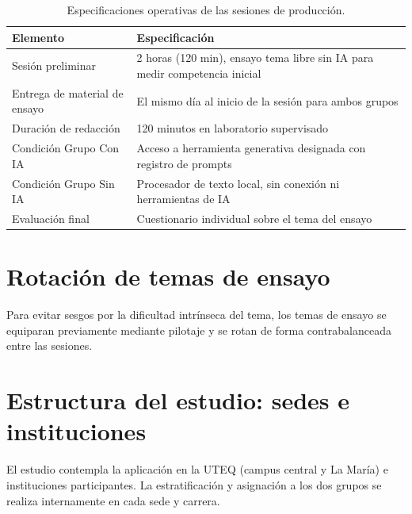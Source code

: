 \documentclass[12pt,a4paper,openany]{report}
\begin{document}
    \begin{table}[htbp]
        \centering
        \caption{Especificaciones operativas de las sesiones de producci\'on.}
        \label{tab:condiciones}
        \small
        \begin{tabular}{L{4.5cm} L{9.0cm}}
            \toprule
            \textbf{Elemento} & \textbf{Especificaci\'on} \\
            \midrule
            Sesi\'on preliminar & 2 horas (120 min), ensayo tema libre sin IA para medir competencia inicial \\
            Entrega de material de ensayo & El mismo d\'ia al inicio de la sesi\'on para ambos grupos \\
            Duraci\'on de redacci\'on & 120 minutos en laboratorio supervisado \\
            Condici\'on Grupo Con IA & Acceso a herramienta generativa designada con registro de prompts \\
            Condici\'on Grupo Sin IA & Procesador de texto local, sin conexi\'on ni herramientas de IA \\
            Evaluaci\'on final & Cuestionario individual sobre el tema del ensayo \\
            \bottomrule
        \end{tabular}
    \end{table}
    
    \section{Rotaci\'on de temas de ensayo}
    
    Para evitar sesgos por la dificultad intr\'inseca del tema, los temas de ensayo se equiparan previamente mediante pilotaje y se rotan de forma contrabalanceada entre las sesiones.
    
    \section{Estructura del estudio: sedes e instituciones}
    
    El estudio contempla la aplicaci\'on en la UTEQ (campus central y La Mar\'ia) e instituciones participantes. La estratificaci\'on y asignaci\'on a los dos grupos se realiza internamente en cada sede y carrera.
    
\end{document}

